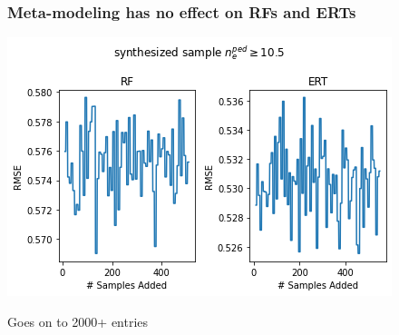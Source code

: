 \documentclass{beamer}
\begin{document}
\begin{frame}
\frametitle{Meta-modeling has no effect on RFs and ERTs}
\begin{center}
\includegraphics[scale=0.6]{./src/ERT_vs_RF_meta_modeling}
\end{center}
Goes on to 2000+ entries
\end{frame}
\end{document}
